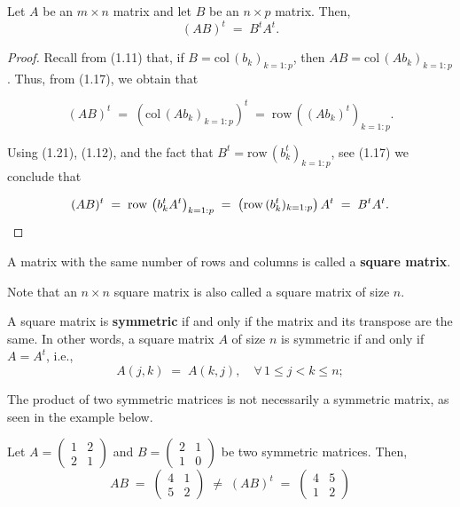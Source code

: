 \begin{lemma}
Let $A$ be an $m\times n$ matrix and let $B$ be an $n\times p$ matrix.
Then,
\begin{equation}
(AB)^t \;=\; B^tA^t.
\end{equation}
\end{lemma}

\begin{proof}
Recall from (1.11) that, if $B=\mathrm{col}\,(b_k)_{k=1:p}$, then
$AB=\mathrm{col}\,(Ab_k)_{k=1:p}$. Thus, from (1.17), we obtain that

\[
(AB)^t \;=\; \left(\mathrm{col}\,(Ab_k)_{k=1:p}\right)^t \;=\;
\mathrm{row}\,\left((Ab_k)^t\right)_{k=1:p}.
\]

Using (1.21), (1.12), and the fact that $B^t=\mathrm{row}\,(b_k^t)_{k=1:p}$,
see (1.17) we conclude that

\begin{equation*}
(AB)^t \;=\; \mathrm{row}\,\left(b_k^tA^t\right)_{k=1:p} \;=\;
\left(\mathrm{row}\,(b_k^t)_{k=1:p}\right)A^t \;=\; B^tA^t. \qedhere
\end{equation*}
\end{proof}

\begin{definition}
A matrix with the same number of rows and columns is called a
\textbf{square matrix}.
\end{definition}

Note that an $n\times n$ square matrix is also called a square matrix of
size $n$.

\begin{definition}
A square matrix is \textbf{symmetric} if and only if the matrix and its
transpose are the same. In other words, a square matrix $A$ of size $n$ is
symmetric if and only if $A=A^t$, i.e.,
\[
A(j,k) \;=\; A(k,j), \quad \forall\, 1\le j<k\le n;
\]
\end{definition}

The product of two symmetric matrices is not necessarily a symmetric
matrix, as seen in the example below.

\begin{examplex}
Let $A=\begin{pmatrix}1&2\\2&1\end{pmatrix}$ and
$B=\begin{pmatrix}2&1\\1&0\end{pmatrix}$ be two symmetric matrices. Then,
\[
AB \;=\; \begin{pmatrix}4&1\\5&2\end{pmatrix} \;\ne\; (AB)^t \;=\;
\begin{pmatrix}4&5\\1&2\end{pmatrix}
\]
\end{examplex}

